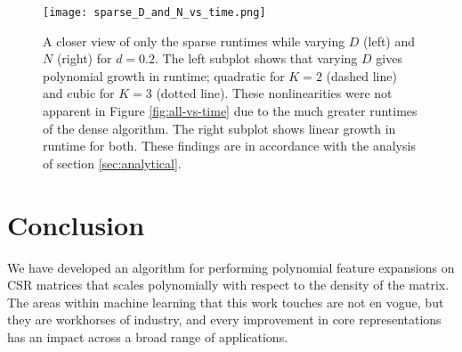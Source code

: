 \documentclass{article}
\begin{document}
\begin{figure*}[ht!]
\vskip 0.2in
\begin{center}
\centerline{\texttt{[image: sparse\_D\_and\_N\_vs\_time.png]}}
\caption{A closer view of only the sparse runtimes while varying $D$ (left) and $N$ (right) for $d = 0.2$. The left subplot shows that varying $D$ gives polynomial growth in runtime; quadratic for $K = 2$ (dashed line) and cubic for $K = 3$ (dotted line). These nonlinearities were not apparent in Figure \ref{fig:all-vs-time} due to the much greater runtimes of the dense algorithm. The right subplot shows linear growth in runtime for both. These findings are in accordance with the analysis of section \ref{sec:analytical}.}
\label{fig:sparse_D_and_N_vs_time}
\end{center}
\vskip -0.2in
\end{figure*}


\section{Conclusion}
We have developed an algorithm for performing polynomial feature expansions on CSR matrices that scales polynomially with respect to the density of the matrix.
The areas within machine learning that this work touches are not en vogue, but they are workhorses of industry, and every improvement in core representations has an impact across a broad range of applications. 

\newpage



\end{document}

